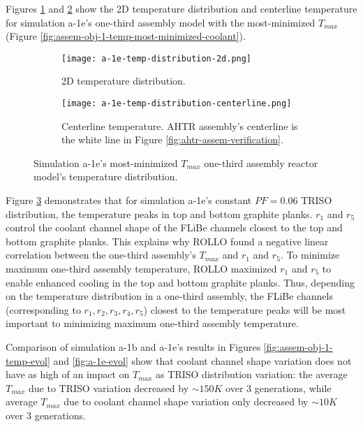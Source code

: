 Figures \ref{fig:a-1e-temp-distribution-2d} and \ref{fig:a-1e-temp-distribution-centerline}
show the 2D temperature distribution and centerline temperature for simulation a-1e's 
one-third assembly model with the most-minimized $T_{max}$ (Figure 
\ref{fig:assem-obj-1-temp-most-minimized-coolant}). 
\begin{figure}[htbp!]
    \begin{subfigure}{\textwidth}
        \centering
        \texttt{[image: a-1e-temp-distribution-2d.png]}
        \caption{2D temperature distribution.}
        \label{fig:a-1e-temp-distribution-2d} 
    \end{subfigure}
    \begin{subfigure}{\textwidth}
        \centering
        \texttt{[image: a-1e-temp-distribution-centerline.png]}
        \caption{Centerline temperature. AHTR assembly's centerline is the white line 
        in Figure \ref{fig:ahtr-assem-verification}.}
        \label{fig:a-1e-temp-distribution-centerline} 
    \end{subfigure}
    \caption{Simulation a-1e's most-minimized $T_{max}$ one-third assembly reactor 
    model's temperature distribution.}
    \label{fig:a-1e-temp-distribution}
\end{figure}

Figure \ref{fig:a-1e-temp-distribution} demonstrates that for simulation a-1e's 
constant $PF=0.06$ TRISO distribution, the temperature peaks in top and bottom 
graphite planks. 
$r_1$ and $r_5$ control the coolant channel shape of the \gls{FLiBe} channels closest 
to the top and bottom graphite planks. 
This explains why \gls{ROLLO} found a negative linear correlation 
between the one-third assembly's $T_{max}$ and $r_1$ and $r_5$. 
To minimize maximum one-third assembly temperature, \gls{ROLLO} maximized
$r_1$ and $r_5$ to enable enhanced cooling in the top and bottom graphite planks. 
Thus, depending on the temperature distribution in a one-third assembly, the \gls{FLiBe} 
channels (corresponding to $r_1, r_2, r_3, r_4, r_5$) closest to the temperature peaks 
will be most important to minimizing maximum one-third assembly temperature. 

Comparison of simulation a-1b and a-1e's results in 
Figures \ref{fig:assem-obj-1-temp-evol} and \ref{fig:a-1e-evol} 
show that coolant channel shape variation does not have as high of an impact on 
$T_{max}$ as \gls{TRISO} distribution variation: the average $T_{max}$ due to 
\gls{TRISO} variation decreased by $\sim150K$ over 3 generations, while average 
$T_{max}$ due to coolant channel shape variation only decreased by $\sim10K$ over 
3 generations. 

